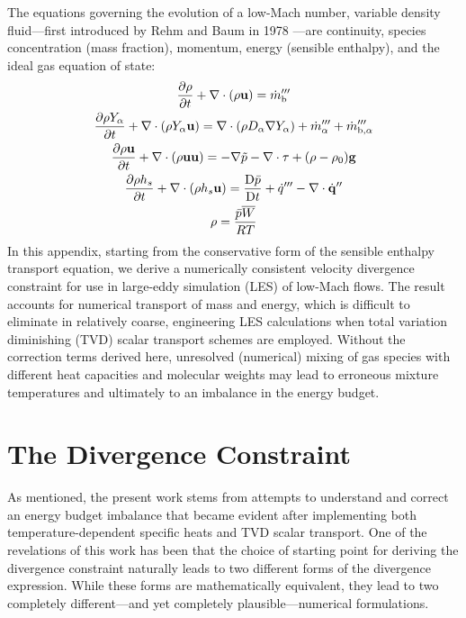 The equations governing the evolution of a low-Mach number, variable density fluid---first introduced by Rehm and Baum in 1978 \cite{Rehm:1}---are continuity, species concentration (mass fraction), momentum, energy (sensible enthalpy), and the ideal gas equation of state:
\begin{gather}
\label{eqn_rho} \frac{\partial \rho}{\partial t} + \nabla\cdot(\rho\mathbf{u}) = \dot{m}_{\rm b}''' \\
\label{eqn_Y_a} \frac{\partial \rho Y_\alpha}{\partial t} + \nabla\cdot(\rho Y_\alpha \mathbf{u}) = \nabla\cdot (\rho D_\alpha \nabla Y_\alpha) + \dot{m}_\alpha^{\prime\prime\prime} + \dot{m}_{\rm b,\alpha}^{\prime\prime\prime} \\
\label{eqn_u}   \frac{\partial \rho \mathbf{u}}{\partial t} + \nabla\cdot(\rho \mathbf{u} \mathbf{u}) = -\nabla \tilde{p} - \nabla\cdot\mathbf{\tau} + (\rho-\rho_0) \mathbf{g} \\
\label{eqn_h_s} \frac{\partial \rho h_s}{\partial t} + \nabla\cdot(\rho h_s \mathbf{u}) = \frac{\mbox{D} \bar{p}}{\mbox{D} t} + \dot{q}^{\prime\prime\prime} - \nabla\cdot \dot{\mathbf{q}}^{\prime\prime} \\
\label{eqn_eos} \rho = \frac{\bar{p} \overline{W}}{RT}
\end{gather}
In this appendix, starting from the conservative form of the sensible enthalpy transport equation, we derive a numerically consistent velocity divergence constraint for use in large-eddy simulation (LES) of low-Mach flows.  The result accounts for numerical transport of mass and energy, which is difficult to eliminate in relatively coarse, engineering LES calculations when total variation diminishing (TVD) scalar transport schemes are employed.  Without the correction terms derived here, unresolved (numerical) mixing of gas species with different heat capacities and molecular weights may lead to erroneous mixture temperatures and ultimately to an imbalance in the energy budget.

\section{The Divergence Constraint}
\label{div_constraint}

As mentioned, the present work stems from attempts to understand and correct an energy budget imbalance that became evident after implementing both temperature-dependent specific heats and TVD scalar transport. One of the revelations of this work has been that the choice of starting point for deriving the divergence constraint naturally leads to two different forms of the divergence expression.  While these forms are mathematically equivalent, they lead to two completely different---and yet completely plausible---numerical formulations.

